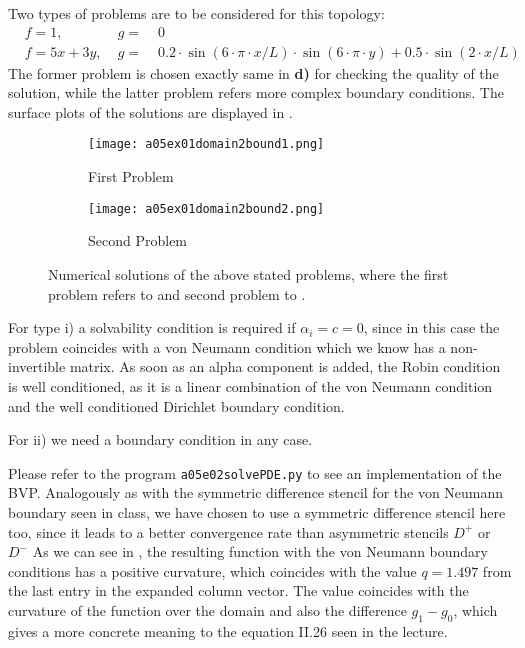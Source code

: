 %
Two types of problems are to be considered for this topology:
\begin{align}
	\label{eq:problem1}
	&f = 1, \;    	 & g = & \;0 \\
	\label{eq:problem2}
	&f = 5x + 3y, \; & g = & \; 0.2 \cdot \sin(6\cdot \pi \cdot x/L) \cdot \sin(6 \cdot \pi \cdot y) + 0.5 \cdot \sin(2\cdot x/L)
\end{align}
The former problem is chosen exactly same in \textbf{d)} for checking the quality of the solution, while the latter problem refers more complex boundary conditions.
The surface plots of the solutions are displayed in .
%
\begin{figure}[H]
\vspace*{\FigUpperVSpace}
\def\MeshFigWidth{210pt}
	\begin{subfigure}[b]{0.5\hsize}
		\centering
		\texttt{[image: a05ex01domain2bound1.png]} 
		\caption{First Problem}
		\label{fig:a05ex01domain2bound1}
	\end{subfigure}
	\begin{subfigure}[b]{0.5\hsize}
		\centering
		\texttt{[image: a05ex01domain2bound2.png]} 
		\caption{Second Problem}
		\label{fig:a05ex01domain2bound2}
	\end{subfigure}
	\caption{Numerical solutions of the above stated problems, where the first problem refers to  and second problem to .}
	\label{fig:a05ex01f}
\end{figure}

%
%

For type i) a solvability condition is required if $\alpha_i=c=0$, since in this case the problem coincides with a von Neumann condition which we know has a non- invertible matrix. As soon as an alpha component is added, the Robin condition is well conditioned, as it is a linear combination of the von Neumann condition and the well conditioned Dirichlet boundary condition.
\par
For ii) we need a boundary condition in any case.

Please refer to the program \texttt{a05e02solvePDE.py} to see an implementation of the BVP. Analogously as with the symmetric difference stencil for the von Neumann boundary seen in class, we have chosen to use a symmetric difference stencil here too, since it leads to a better convergence rate than asymmetric stencils $D^+$ or $D^-$
As we can see in , the resulting function with the von Neumann boundary conditions has a positive curvature, which coincides with the value $q=1.497$ from the last entry in the expanded column vector. The value coincides with the curvature of the function over the domain and also the difference $g_1-g_0$, which gives a more concrete meaning to the equation II.26 seen in the lecture.

